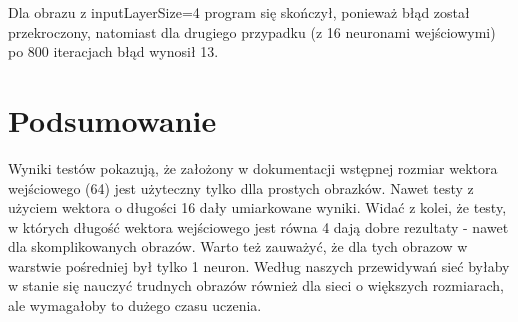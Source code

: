 \documentclass[12pt,a4paper,oneside]{article}
\begin{document}
Dla obrazu z inputLayerSize=4 program się skończył, ponieważ błąd został przekroczony, natomiast dla drugiego przypadku (z 16 neuronami wejściowymi) po 800 iteracjach błąd wynosił 13.


\section{Podsumowanie}
Wyniki testów pokazują, że założony w dokumentacji wstępnej rozmiar wektora wejściowego (64) jest użyteczny tylko dlla prostych obrazków. Nawet testy z użyciem wektora o długości 16 dały umiarkowane wyniki. Widać z kolei, że testy, w których długość wektora wejściowego jest równa 4 dają dobre rezultaty - nawet dla skomplikowanych obrazów. Warto też zauważyć, że dla tych obrazow w warstwie pośredniej był tylko 1 neuron. Według naszych przewidywań sieć byłaby w stanie się nauczyć trudnych obrazów również dla sieci o większych rozmiarach, ale wymagałoby to dużego czasu uczenia.
\end{document}
